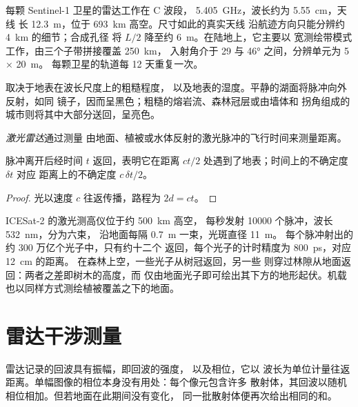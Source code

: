 每颗 Sentinel-1 卫星的雷达工作在 C 波段，
\qty{5.405}{GHz}，波长约为 \qty{5.55}{cm}，天线
长 \qty{12.3}{m}，位于 \qty{693}{km} 高空。尺寸如此的真实天线
沿航迹方向只能分辨约 \qty{4}{km} 的细节；合成孔径
将 $L/2$ 降至约 \qty{6}{m}。在陆地上，它主要以
宽测绘带模式工作，由三个子带拼接覆盖 \qty{250}{km}，
入射角介于 29 与 \ang{46} 之间，分辨单元为 5 × \qty{20}{m}。
每颗卫星的轨道每 12 天重复一次。

取决于地表在波长尺度上的粗糙程度，
以及地表的湿度。平静的湖面将脉冲向外反射，如同
镜子，因而呈黑色；粗糙的熔岩流、森林冠层或由墙体和
拐角组成的城市则将其中大部分送回，呈亮色。

\begin{definition}[激光雷达]\label{def:b3:remote-sensing-gis:lidar}
\emph{激光雷达}通过测量
由地面、植被或水体反射的激光脉冲的飞行时间来测量距离。
\end{definition}

\begin{proposition}[飞行时间]\label{prop:b3:remote-sensing-gis:tof}
脉冲离开后经时间 $t$ 返回，表明它在距离
$ct/2$ 处遇到了地表；时间上的不确定度 $\delta t$ 对应
距离上的不确定度 $c\,\delta t/2$。
\end{proposition}

\begin{proof}
光以速度 $c$ 往返传播，路程为 $2d = ct$。
\end{proof}

ICESat-2 的激光测高仪位于约 \qty{500}{km} 高空，
每秒发射 \num{10000} 个脉冲，波长 \qty{532}{nm}，分为六束，
沿地面每隔 \qty{0.7}{m} 一束，光斑直径 \qty{11}{m}。
每个脉冲射出的约 300 万亿个光子中，只有约十二个
返回，每个光子的计时精度为 \qty{800}{ps}，对应 \qty{12}{cm} 的距离。
在森林上空，一些光子从树冠返回，另一些
则穿过林隙从地面返回：两者之差即树木的高度，而
仅由地面光子即可绘出其下方的地形起伏。机载
也以同样方式测绘植被覆盖之下的地面。

\section{雷达干涉测量}\label{sec:b3:remote-sensing-gis:insar}

雷达记录的回波具有振幅，即回波的强度，
以及相位，它以
波长为单位计量往返距离。单幅图像的相位本身没有用处：每个像元包含许多
散射体，其回波以随机相位相加。但若地面在此期间没有变化，
同一批散射体便再次给出相同的和。

